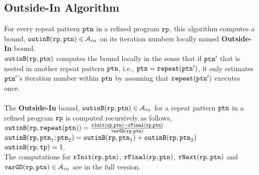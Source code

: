 \subsection{Outside-In Algorithm}
\label{sec:outinalg}
For every repeat pattern $\mathtt{ptn}$ in a refined program $\mathtt{rp}$, 
this algorithm
computes a bound, $\mathtt{outinB}(\mathtt{rp}, \mathtt{ptn}) \in \mathcal{A}_{in}$ on its iteration numbers locally named \textbf{Outside-In} bound.
\\
$\mathtt{outinB}(\mathtt{rp}, \mathtt{ptn})$
computes the bound locally
in the sense that
if $\mathtt{ptn}'$ that is nested
in another repeat pattern $\mathtt{ptn}$, i.e., $\mathtt{ptn} = \mathtt{repeat}(\mathtt{ptn}')$,
it only estimates
$\mathtt{ptn}'$'s iteration number within $\mathtt{ptn}$ by assuming that $\mathtt{repeat}(\mathtt{ptn}')$ executes once.
\\ 
\\
The \textbf{Outside-In} bound, $\mathtt{outinB}(\mathtt{rp}, \mathtt{ptn}) \in \mathcal{A}_{in}$
for a repeat pattern $\mathtt{ptn}$ in a refined program $\mathtt{rp}$
is computed recursively as follows,
\\
$\mathtt{outinB}(\mathtt{rp}, \mathtt{repeat}({\mathtt{ptn}})) =  \frac{\mathtt{rInit}(\mathtt{rp}, \mathtt{ptn}) - \mathtt{rFinal}(\mathtt{rp}, \mathtt{ptn})}{\mathtt{varGD}(\mathtt{rp}, \mathtt{ptn})}$
\\
$\mathtt{outinB}(\mathtt{rp}, \mathtt{ptn}_1; \mathtt{ptn}_2) =  \mathtt{outinB}(\mathtt{rp}, \mathtt{ptn}_1)+ \mathtt{outinB}(\mathtt{rp},  \mathtt{ptn}_2)$
\\
$\mathtt{outinB}(\mathtt{rp}, \mathtt{tp}) =  1$.
\\
The computations for $\mathtt{rInit}(\mathtt{rp}, \mathtt{ptn})$,
$\mathtt{rFinal}(\mathtt{rp}, \mathtt{ptn})$, $\mathtt{rNext}(\mathtt{rp}, \mathtt{ptn})$ and $\mathtt{varGD}(\mathtt{rp}, \mathtt{ptn}) \in \mathcal{A}_{in}$
are in the full version.
